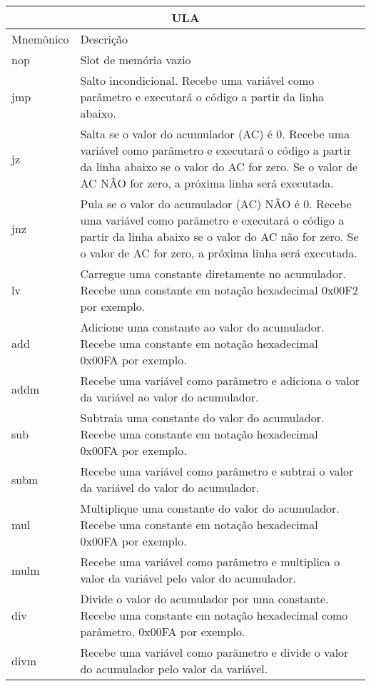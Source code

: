 \vspace{1cm}
\begin{longtable}{ |p{3cm}||p{11cm}|  }
  \hline
  \multicolumn{2}{|c|}{ULA} \\
  \hline
  Mnemônico &
  Descrição\\
  \hline
  nop &
  Slot de memória vazio \\
  \hline
  jmp &
  Salto incondicional. Recebe uma variável como parâmetro e executará o código a partir da linha abaixo. \\
  \hline
  jz &
  Salta se o valor do acumulador (AC) é 0. Recebe uma variável como parâmetro e executará o código a partir da linha abaixo se o valor do AC for zero. Se o valor de AC NÃO for zero, a próxima linha será executada. \\
  \hline
  jnz &
  Pula se o valor do acumulador (AC) NÃO é 0. Recebe uma variável como parâmetro e executará o código a partir da linha abaixo se o valor do AC não for zero. Se o valor de AC for zero, a próxima linha será executada. \\
  \hline
  lv &
  Carregue uma constante diretamente no acumulador. Recebe uma constante em notação hexadecimal 0x00F2 por exemplo. \\
  \hline
  add &
  Adicione uma constante ao valor do acumulador. Recebe uma constante em notação hexadecimal 0x00FA por exemplo. \\
  \hline
  addm &
  Recebe uma variável como parâmetro e adiciona o valor da variável ao valor do acumulador. \\
  \hline
  sub &
  Subtraia uma constante do valor do acumulador. Recebe uma constante em notação hexadecimal 0x00FA por exemplo. \\
  \hline
  subm &
  Recebe uma variável como parâmetro e subtrai o valor da variável do valor do acumulador. \\
  \hline
  \hline
  mul &
  Multiplique uma constante do valor do acumulador. Recebe uma constante em notação hexadecimal 0x00FA por exemplo. \\
  \hline
  mulm &
  Recebe uma variável como parâmetro e multiplica o valor da variável pelo valor do acumulador. \\
  \hline
  div &
  Divide o valor do acumulador por uma constante. Recebe uma constante em notação hexadecimal como parâmetro, 0x00FA por exemplo. \\
  \hline
  divm &
  Recebe uma variável como parâmetro e divide o valor do acumulador pelo valor da variável. \\

\end{longtable}
